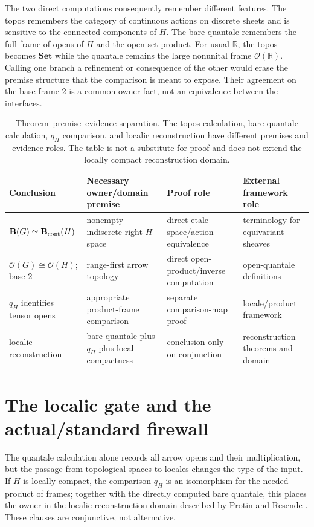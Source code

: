 \documentclass[12pt]{article}
\theoremstyle{definition}
\newcommand{\B}{\mathbf B}
\newcommand{\Ocal}{\mathcal O}
\newcommand{\R}{\mathbb R}
\newcommand{\Set}{\mathbf{Set}}
\begin{document}
The two direct computations consequently remember different features.  The topos remembers the category of continuous actions on discrete sheets and is sensitive to the connected components of $H$.  The bare quantale remembers the full frame of opens of $H$ and the open-set product.  For usual $\R$, the topos becomes $\Set$ while the quantale remains the large nonunital frame $\Ocal(\R)$.  Calling one branch a refinement or consequence of the other would erase the premise structure that the comparison is meant to expose.  Their agreement on the base frame $2$ is a common owner fact, not an equivalence between the interfaces.

\begin{table}[htbp]
\centering\scriptsize
\caption{Theorem--premise--evidence separation.  The topos calculation, bare quantale calculation, $q_H$ comparison, and localic reconstruction have different premises and evidence roles.  The table is not a substitute for proof and does not extend the locally compact reconstruction domain.}\label{tab:t2}
\begin{tabularx}{\textwidth}{P{0.19\textwidth}P{0.25\textwidth}P{0.25\textwidth}Y}
\toprule
Conclusion & Necessary owner/domain premise & Proof role & External framework role \\
\midrule
$\B(G)\simeq\B_{\rm cont}(H)$ & nonempty indiscrete right $H$-space & direct etale-space/action equivalence & terminology for equivariant sheaves \\
$\Ocal(G)\cong\Ocal(H)$; base $2$ & range-first arrow topology & direct open-product/inverse computation & open-quantale definitions \\
$q_H$ identifies tensor opens & appropriate product-frame comparison & separate comparison-map proof & locale/product framework \\
localic reconstruction & bare quantale plus $q_H$ plus local compactness & conclusion only on conjunction & reconstruction theorems and domain \\
\bottomrule
\end{tabularx}
\end{table}

\section{The localic gate and the actual/standard firewall}

The quantale calculation alone records all arrow opens and their multiplication, but the passage from topological spaces to locales changes the type of the input.  If $H$ is locally compact, the comparison $q_H$ is an isomorphism for the needed product of frames; together with the directly computed bare quantale, this places the owner in the localic reconstruction domain described by Protin and Resende \cite[Theorems~2.41 and~2.45, printed pp.~214--215 and 245--246]{protinresende2012}.  These clauses are conjunctive, not alternative.
\end{document}
